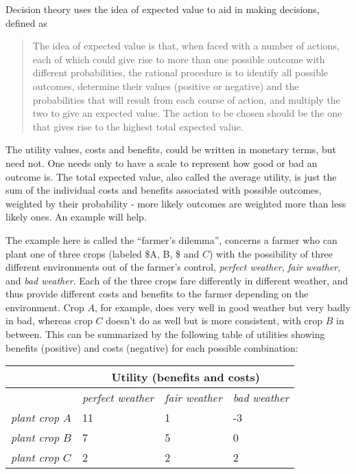 \documentclass{tufte-book}
\begin{document}
Decision theory uses the idea of expected value to aid in making
decisions, defined as\citep{Wikipedia:2015aa}

\begin{quote}
The idea of expected value is that, when faced with a number of actions, each of which could give rise to more than one possible outcome with different probabilities, the rational procedure is to identify all
possible outcomes, determine their values (positive or negative) and the
probabilities that will result from each course of action, and multiply
the two to give an expected value. The action to be chosen should be the
one that gives rise to the highest total expected value.
\end{quote}

The utility values, costs and benefits, could be written in monetary
terms, but need not. One needs only to have a scale to represent how
good or bad an outcome is. The total expected value, also called the
average utility, is just the sum of the individual costs and benefits
associated with possible outcomes, weighted by their probability - more
likely outcomes are weighted more than less likely ones. An example will
help.

The example here is called the ``farmer's
dilemma''\citep{jordaan2005decisions}, concerns a farmer who can plant
one of three crops (labeled \$A, B, \$ and \(C\)) with the possibility
of three different environments out of the farmer's control,
\emph{perfect weather}, \emph{fair weather}, and \emph{bad weather}.
Each of the three crops fare differently in different weather, and thus
provide different costs and benefits to the farmer depending on the
environment. Crop \(A\), for example, does very well in good weather but
very badly in bad, whereas crop \(C\) doesn't do as well but is more
consistent, with crop \(B\) in between. This can be summarized by the
following table of utilities showing benefits (positive) and costs
(negative) for each possible combination:

\begin{tabular}{@{}llll@{}}
\toprule
 & \multicolumn{3}{c}{\textbf{Utility (benefits and costs)}}   \\ \midrule
 & \textit{perfect weather} & \textit{fair weather} & \textit{bad weather}   \\
\textit{plant crop $A$} & 11 & 1 & -3  \\
\textit{plant crop $B$} & 7 & 5 & 0  \\
\textit{plant crop $C$} & 2 & 2 & 2   \\ \bottomrule
\end{tabular}\vspace{.1in}
\end{document}
